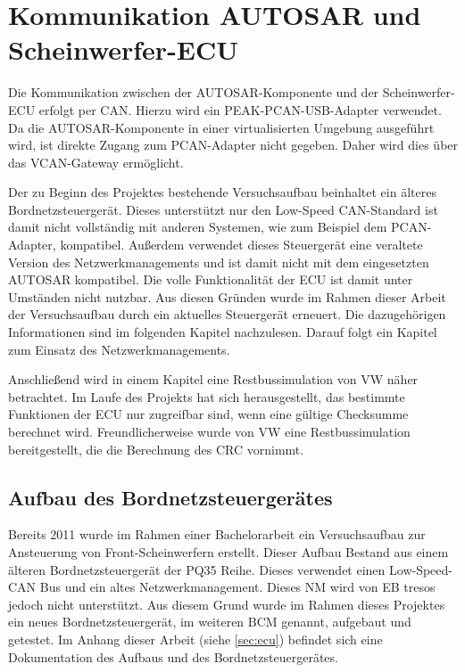 \documentclass[
  a4paper,					    %
  twoside,
  DIV=calc,     				%
  bibliography=totoc,
  cleardoublepage=empty,
  ngerman,     					%
  final       					%
]{scrbook}
\begin{document}
\section{Kommunikation AUTOSAR und Scheinwerfer-ECU}
\label{sec:Kommunikation_A_S}
Die Kommunikation zwischen der AUTOSAR-Komponente und der Scheinwerfer-ECU erfolgt per CAN. Hierzu wird ein PEAK-PCAN-USB-Adapter verwendet. Da die AUTOSAR-Komponente in einer virtualisierten Umgebung ausgeführt wird, ist direkte Zugang zum PCAN-Adapter nicht gegeben. Daher wird dies über das VCAN-Gateway ermöglicht.

Der zu Beginn des Projektes bestehende Versuchsaufbau beinhaltet ein älteres Bordnetzsteuergerät. Dieses unterstützt nur den Low-Speed CAN-Standard ist damit nicht vollständig mit anderen Systemen, wie zum Beispiel dem PCAN-Adapter, kompatibel. Außerdem verwendet dieses Steuergerät eine veraltete Version des Netzwerkmanagements und ist damit nicht mit dem eingesetzten AUTOSAR kompatibel. Die volle Funktionalität der ECU ist damit unter Umständen nicht nutzbar. Aus diesen Gründen wurde im Rahmen dieser Arbeit der Versuchsaufbau durch ein aktuelles Steuergerät erneuert. Die dazugehörigen Informationen sind im folgenden Kapitel nachzulesen. Darauf folgt ein Kapitel zum Einsatz des Netzwerkmanagements.

Anschließend wird in einem Kapitel eine Restbussimulation von VW näher betrachtet. Im Laufe des Projekts hat sich herausgestellt, das bestimmte Funktionen der ECU nur zugreifbar sind, wenn eine gültige Checksumme berechnet wird. Freundlicherweise wurde von VW eine Restbussimulation bereitgestellt, die die Berechnung des CRC vornimmt. 




\subsection{Aufbau des Bordnetzsteuergerätes}
\label{sec:Aufbau_der_ECU}
Bereits 2011 wurde im Rahmen einer Bachelorarbeit ein Versuchsaufbau zur Ansteuerung von Front-Scheinwerfern erstellt. Dieser Aufbau Bestand aus einem älteren Bordnetzsteuergerät der PQ35 Reihe. Dieses verwendet einen Low-Speed-CAN Bus und ein altes Netzwerkmanagement. Dieses NM wird von EB tresos jedoch nicht unterstützt. Aus diesem Grund wurde im Rahmen dieses Projektes ein neues Bordnetzsteuergerät, im weiteren BCM genannt, aufgebaut und getestet. Im Anhang dieser Arbeit (siehe \ref{sec:ecu}) befindet sich eine Dokumentation des Aufbaus und des Bordnetzsteuergerätes.
\end{document}
